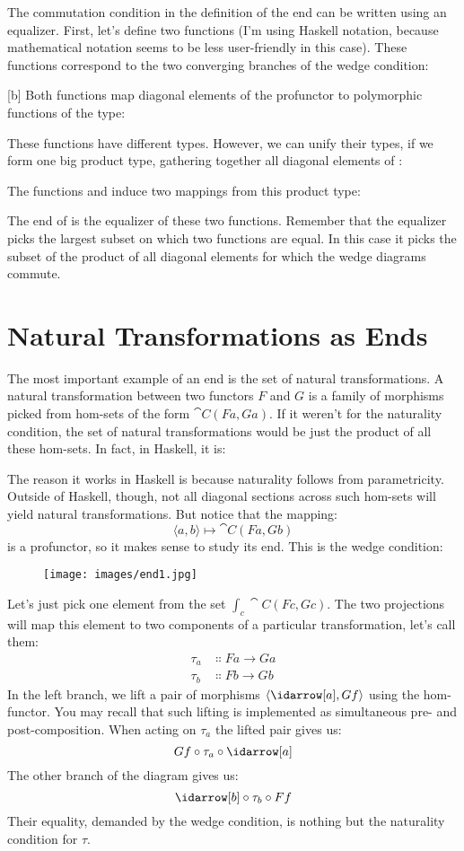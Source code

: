 The commutation condition in the definition of the end can be written
using an equalizer. First, let's define two functions (I'm using Haskell
notation, because mathematical notation seems to be less user-friendly
in this case). These functions correspond to the two converging branches
of the wedge condition:

[b]
Both functions map diagonal elements of the profunctor  to
polymorphic functions of the type:

These functions have different types. However, we can unify their types,
if we form one big product type, gathering together all diagonal
elements of :

The functions  and  induce two mappings from
this product type:

The end of  is the equalizer of these two functions. Remember
that the equalizer picks the largest subset on which two functions are
equal. In this case it picks the subset of the product of all diagonal
elements for which the wedge diagrams commute.

\section{Natural Transformations as Ends}

The most important example of an end is the set of natural
transformations. A natural transformation between two functors
$F$ and $G$ is a family of morphisms picked from hom-sets
of the form $\cat{C}(F a, G a)$. If it weren't for the naturality
condition, the set of natural transformations would be just the product
of all these hom-sets. In fact, in Haskell, it is:

The reason it works in Haskell is because naturality follows from
parametricity. Outside of Haskell, though, not all diagonal sections
across such hom-sets will yield natural transformations. But notice that
the mapping:
\[\langle a, b \rangle \mapsto \cat{C}(F a, G b)\]
is a profunctor, so it makes sense to study its end. This is the wedge
condition:

\begin{figure}[H]
  \centering
  \texttt{[image: images/end1.jpg]}
\end{figure}

\noindent
Let's just pick one element from the set $\int_c \cat{C}(F c, G c)$.
The two projections will map this element to two components of a
particular transformation, let's call them:
\begin{align*}
  \tau_a & \Colon F a \to G a \\
  \tau_b & \Colon F b \to G b
\end{align*}
In the left branch, we lift a pair of morphisms
$\langle \idarrow[a], G f \rangle$ using the hom-functor. You
may recall that such lifting is implemented as simultaneous pre- and
post-composition. When acting on $\tau_a$ the lifted pair gives us:
\[G f \circ \tau_a \circ \idarrow[a]\]
The other branch of the diagram gives us:
\[\idarrow[b] \circ \tau_b \circ F f\]
Their equality, demanded by the wedge condition, is nothing but the
naturality condition for $\tau$.

